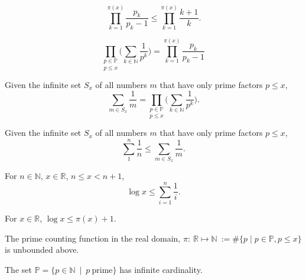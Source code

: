 \begin{lemma}
\label{lem:lemma4}
$$\prod_{k=1}^{\pi(x)}\frac{p_k}{p_k-1} \le \prod_{k=1}^{\pi(x)}\frac{k+1}{k}.$$
\end{lemma}

\begin{lemma}
\label{lem:lemma3}
    $$\underset{p\le x}{\prod_{p\in\mathbb{P}}}\Big(\sum_{k\in\mathbb{N}}\frac{1}{p^k}\Big) = \prod_{k=1}^{\pi(x)}\frac{p_k}{p_k-1}$$
\end{lemma}

\begin{lemma}
\label{lem:lemma2}
Given the infinite set $S_x$ of all numbers $m$ that have only prime factors $p\le x$,
    $$\sum_{m\in S_x}\frac{1}{m} = \underset{p\le x}{\prod_{p\in\mathbb{P}}}\Big(\sum_{k\in\mathbb{N}}\frac{1}{p^k}\Big).$$
\end{lemma}

\begin{lemma}
\label{lem:lemma1}
Given the infinite set $S_x$ of all numbers $m$ that have only prime factors $p\le x$,
$$\sum_1^n\frac1n \le \sum_{m\in S_x}\frac{1}{m}. $$
\end{lemma}

\begin{lemma}
\label{lem:lemma0}
For $n\in\mathbb{N}$, $x\in\mathbb{R}$, $n\le x < n+1$,
$$\log x \le \sum_{i=1}^n\frac1i.$$
\end{lemma}

\begin{theorem}
\label{thm:log_le_primeCountingReal_add_one}
For $x\in\mathbb{R}$, $\log x \le \pi(x) +1$.
\end{theorem}

\begin{theorem}
\label{thm:primeCountingReal_unbounded}
The prime counting function in the real domain, $\pi:\ \mathbb{R} \mapsto \mathbb{N} \ := \#\big\{p\mid p \in\mathbb{P}, p\le x \big\}$ is unbounded above.
\end{theorem}

\begin{theorem}
\label{thm:infinite_primes}
The set $\mathbb{P} = \big\{p \in \mathbb{N} \ \mid \ p \ \mathrm{prime} \big\}$ has infinite cardinality. 
\end{theorem}

